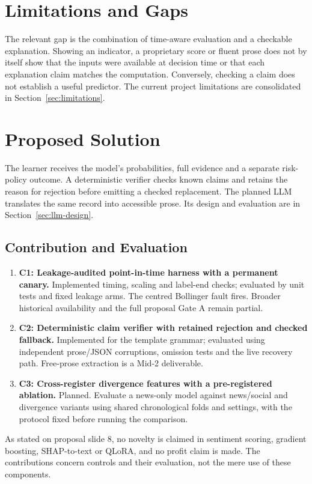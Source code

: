 \section{Limitations and Gaps}
The relevant gap is the combination of time-aware evaluation and a checkable explanation. Showing an indicator, a proprietary score or fluent prose does not by itself show that the inputs were available at decision time or that each explanation claim matches the computation. Conversely, checking a claim does not establish a useful predictor. The current project limitations are consolidated in Section~\ref{sec:limitations}.
\section{Proposed Solution}
The learner receives the model's probabilities, full evidence and a separate risk-policy outcome. A deterministic verifier checks known claims and retains the reason for rejection before emitting a checked replacement. The planned LLM translates the same record into accessible prose. Its design and evaluation are in Section~\ref{sec:llm-design}.
\subsection{Contribution and Evaluation}
\begin{enumerate}
\item \textbf{C1: Leakage-audited point-in-time harness with a permanent canary.} Implemented timing, scaling and label-end checks; evaluated by unit tests and fixed leakage arms. The centred Bollinger fault fires. Broader historical availability and the full proposal Gate A remain partial.
\item \textbf{C2: Deterministic claim verifier with retained rejection and checked fallback.} Implemented for the template grammar; evaluated using independent prose/JSON corruptions, omission tests and the live recovery path. Free-prose extraction is a Mid-2 deliverable.
\item \textbf{C3: Cross-register divergence features with a pre-registered ablation.} Planned. Evaluate a news-only model against news/social and divergence variants using shared chronological folds and settings, with the protocol fixed before running the comparison.
\end{enumerate}
As stated on proposal slide 8, no novelty is claimed in sentiment scoring, gradient boosting, SHAP-to-text or QLoRA, and no profit claim is made. The contributions concern controls and their evaluation, not the mere use of these components.
